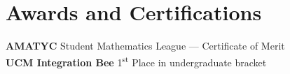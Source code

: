 \documentclass[./Resume.tex]{subfiles}
\begin{document}
\section{Awards and Certifications}
	{\bfseries AMATYC} Student Mathematics League --- Certificate of Merit\\
	{\bfseries UCM Integration Bee} 1\textsuperscript{st} Place in undergraduate bracket
\end{document}
